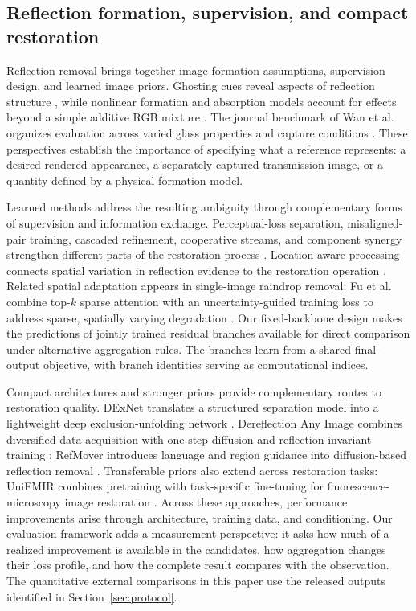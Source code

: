 \documentclass[12pt]{article}
\begin{document}
\subsection{Reflection formation, supervision, and compact restoration}
Reflection removal brings together image-formation assumptions, supervision design, and learned image priors. Ghosting cues reveal aspects of reflection structure \citep{shih2015ghosting}, while nonlinear formation and absorption models account for effects beyond a simple additive RGB mixture \citep{wen2019linearity,zheng2021absorption}. The journal benchmark of Wan et al. organizes evaluation across varied glass properties and capture conditions \citep{wan2023benchmark}. These perspectives establish the importance of specifying what a reference represents: a desired rendered appearance, a separately captured transmission image, or a quantity defined by a physical formation model.

Learned methods address the resulting ambiguity through complementary forms of supervision and information exchange. Perceptual-loss separation, misaligned-pair training, cascaded refinement, cooperative streams, and component synergy strengthen different parts of the restoration process \citep{zhang2018reflection,wei2019misaligned,li2020cascaded,wan2020corrn,hu2021trash,hu2023synergy}. Location-aware processing connects spatial variation in reflection evidence to the restoration operation \citep{dong2021location}. Related spatial adaptation appears in single-image raindrop removal: Fu et al. combine top-$k$ sparse attention with an uncertainty-guided training loss to address sparse, spatially varying degradation \citep{fu2024ustn}. Our fixed-backbone design makes the predictions of jointly trained residual branches available for direct comparison under alternative aggregation rules. The branches learn from a shared final-output objective, with branch identities serving as computational indices.

Compact architectures and stronger priors provide complementary routes to restoration quality. DExNet translates a structured separation model into a lightweight deep exclusion-unfolding network \citep{huang2025dexnet}. Dereflection Any Image combines diversified data acquisition with one-step diffusion and reflection-invariant training \citep{hu2026dereflection}; RefMover introduces language and region guidance into diffusion-based reflection removal \citep{wang2026refmover}. Transferable priors also extend across restoration tasks: UniFMIR combines pretraining with task-specific fine-tuning for fluorescence-microscopy image restoration \citep{ma2024unifmir}. Across these approaches, performance improvements arise through architecture, training data, and conditioning. Our evaluation framework adds a measurement perspective: it asks how much of a realized improvement is available in the candidates, how aggregation changes their loss profile, and how the complete result compares with the observation. The quantitative external comparisons in this paper use the released outputs identified in Section~\ref{sec:protocol}.
\end{document}
